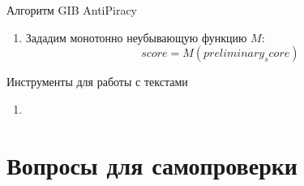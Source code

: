 \begin{frame}{Алгоритм GIB AntiPiracy}
	\begin{enumerate}
		\item Зададим монотонно неубывающую функцию $M$:
		\begin{equation}
		score = M (preliminary_score)
		\end{equation}
	\end{enumerate}
\end{frame}



\begin{frame}{Инструменты для работы с текстами}
	\begin{enumerate}
		\item
	\end{enumerate}

\end{frame}


\section{Вопросы для самопроверки}


